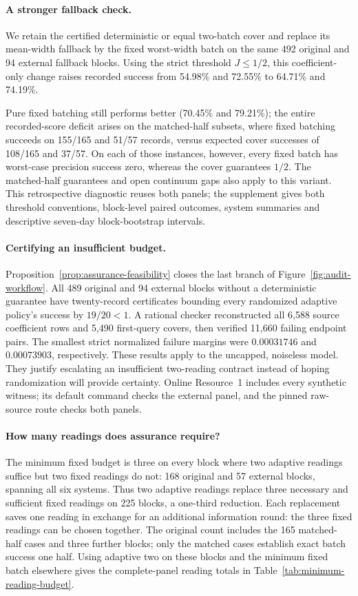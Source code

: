 \documentclass[12pt]{article}
\begin{document}
\paragraph{A stronger fallback check.}
We retain the certified deterministic or equal two-batch cover and replace its mean-width fallback by the fixed worst-width batch on the same 492 original and 94 external fallback blocks. Using the strict threshold $J\leq1/2$, this coefficient-only change raises recorded success from 54.98\% and 72.55\% to 64.71\% and 74.19\%.

Pure fixed batching still performs better (70.45\% and 79.21\%); the entire recorded-score deficit arises on the matched-half subsets, where fixed batching succeeds on 155/165 and 51/57 records, versus expected cover successes of 108/165 and 37/57. On each of those instances, however, every fixed batch has worst-case precision success zero, whereas the cover guarantees $1/2$. The matched-half guarantees and open continuum gaps also apply to this variant. This retrospective diagnostic reuses both panels; the supplement gives both threshold conventions, block-level paired outcomes, system summaries and descriptive seven-day block-bootstrap intervals.
\paragraph{Certifying an insufficient budget.}
Proposition~\ref{prop:assurance-feasibility} closes the last branch of
Figure~\ref{fig:audit-workflow}. All 489 original and 94 external blocks
without a deterministic guarantee have twenty-record certificates bounding
every randomized adaptive policy's success by $19/20<1$. A rational checker
reconstructed all 6,588 source coefficient rows and 5,490 first-query covers,
then verified 11,660 failing endpoint pairs. The smallest strict normalized
failure margins were $0.00031746$ and $0.00073903$, respectively.
These results apply to the uncapped, noiseless model. They justify escalating
an insufficient two-reading contract instead of hoping randomization will
provide certainty. Online Resource~1 includes every synthetic witness; its
default command checks the external panel, and the pinned raw-source route
checks both panels.
\paragraph{How many readings does assurance require?}
The minimum fixed budget is three on every block where two adaptive
readings suffice but two fixed readings do not: 168 original and 57 external
blocks, spanning all six systems. Thus two adaptive readings replace three
necessary and sufficient fixed readings on 225 blocks, a one-third reduction.
Each replacement saves one reading in exchange for an additional information
round: the three fixed readings can be chosen together.
The original count includes the 165 matched-half cases and three further
blocks; only the matched cases establish exact batch success one half.
Using adaptive two on these blocks and the minimum fixed batch elsewhere
gives the complete-panel reading totals in Table~\ref{tab:minimum-reading-budget}.
\end{document}
